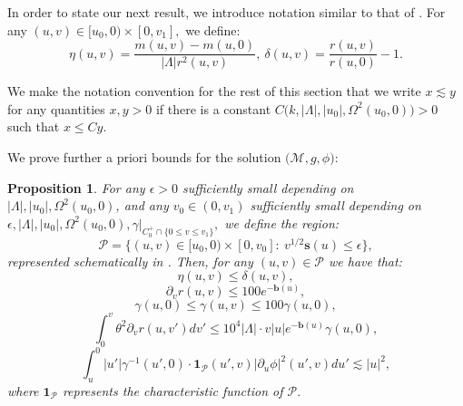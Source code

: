 \documentclass[11pt]{article}
\newtheorem{proposition}{Proposition}[section]
\numberwithin{equation}{section}
\begin{document}
In order to state our next result, we introduce notation similar to that of . For any $(u,v)\in[u_0,0)\times[0,v_1],$ we define:
\[\eta(u,v)=\frac{m(u,v)-m(u,0)}{|\Lambda|r^2(u,v)},\ \delta(u,v)=\frac{r(u,v)}{r(u,0)}-1.\]

We make the notation convention for the rest of this section that we write $x\lesssim y$ for any quantities $x,y>0$ if there is a constant $C\big(k,|\Lambda|,|u_0|,\Omega^2(u_0,0)\big)>0$ such that $x\leq Cy.$ 

We prove further a priori bounds for the solution $\big(\mathcal{M},g,\phi\big):$
\begin{proposition}\label{bounds for locally naked singularity proposition}
    For any $\epsilon>0$ sufficiently small depending on $|\Lambda|,|u_0|,\Omega^2(u_0,0)$, and any $v_0\in(0,v_1)$ sufficiently small depending on $\epsilon,|\Lambda|,|u_0|,\Omega^2(u_0,0),\gamma|_{C_0^+\cap\{0\leq v\leq v_1\}},$ we define the region:
    \begin{equation}
        \mathcal{P}=\Big\{(u,v)\in[u_0,0)\times[0,v_0]:\ v^{1/2}\mathbf{s}(u)\leq \epsilon\Big\},
    \end{equation}
    represented schematically in . Then, for any $(u,v)\in\mathcal{P}$ we have that:
    \begin{equation}\label{eta less than delta}
        \eta(u,v)\leq\delta(u,v),
    \end{equation}
    \begin{equation}
    \partial_vr(u,v)\leq 100e^{-\mathbf{b}(u)},
\end{equation}
\begin{equation}
    \gamma(u,0)\leq \gamma(u,v)\leq 100\gamma(u,0),
\end{equation}
    \begin{equation}\label{background energy bound 1}
    \int_0^v\theta^2\partial_vr(u,v')dv'\leq10^4|\Lambda|\cdot v|u|e^{-\mathbf{b}(u)}\gamma(u,0),
    \end{equation}
    \begin{equation}\label{background energy bound 2}
    \int_u^0|u'|\gamma^{-1}(u',0)\cdot\mathbf{1}_{\mathcal{P}}(u',v)\big|\partial_u\phi\big|^2(u',v)du'\lesssim|u|^2,
    \end{equation}
    where $\mathbf{1}_{\mathcal{P}}$ represents the characteristic function of $\mathcal{P}.$
\end{proposition}
\end{document}

